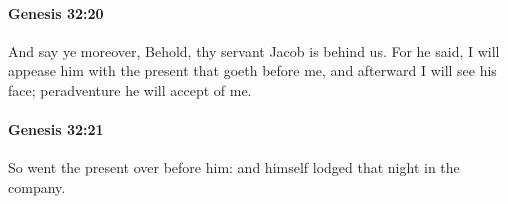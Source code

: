 		\paragraph{Genesis 32:20} %
			\label{GENESIS-32-20}

			And say ye moreover, Behold, thy servant Jacob is behind us. For he said, I will appease him with the present that goeth before me, and afterward I will see his face; peradventure he will accept of me.


		\paragraph{Genesis 32:21} %
			\label{GENESIS-32-21}

			So went the present over before him: and himself lodged that night in the company.


